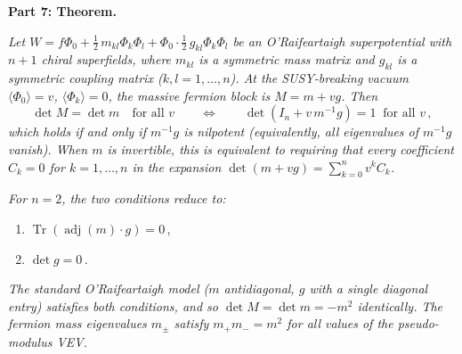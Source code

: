 \bigskip
\textbf{Part 7: Theorem.}

\emph{Let $W = f\Phi_0 + \tfrac{1}{2}\,m_{kl}\Phi_k\Phi_l + \Phi_0\cdot \tfrac{1}{2}\,g_{kl}\Phi_k\Phi_l$
be an O'Raifeartaigh superpotential with $n+1$ chiral superfields, where $m_{kl}$
is a symmetric mass matrix and $g_{kl}$ is a symmetric coupling matrix
($k, l = 1,\ldots,n$). At the SUSY-breaking vacuum
$\langle\Phi_0\rangle = v$, $\langle\Phi_k\rangle = 0$, the massive fermion
block is $M = m + vg$. Then}
$$
\det M = \det m \quad \text{for all } v
\qquad \Longleftrightarrow \qquad
\det(I_n + v\,m^{-1}g) = 1 \;\;\text{for all } v\,,
$$
\emph{which holds if and only if $m^{-1}g$ is nilpotent (equivalently,
all eigenvalues of $m^{-1}g$ vanish). When $m$ is invertible, this is equivalent
to requiring that every coefficient $C_k = 0$ for $k = 1,\ldots,n$ in the
expansion $\det(m + vg) = \sum_{k=0}^n v^k C_k$.}

\emph{For $n = 2$, the two conditions reduce to:}
\begin{enumerate}
\item $\operatorname{Tr}(\operatorname{adj}(m)\cdot g) = 0$\,,
\item $\det g = 0$\,.
\end{enumerate}
\emph{The standard O'Raifeartaigh model ($m$ antidiagonal, $g$ with a single diagonal
entry) satisfies both conditions, and so $\det M = \det m = -m^2$ identically.
The fermion mass eigenvalues $m_\pm$ satisfy $m_+ m_- = m^2$ for all values of
the pseudo-modulus VEV.}

